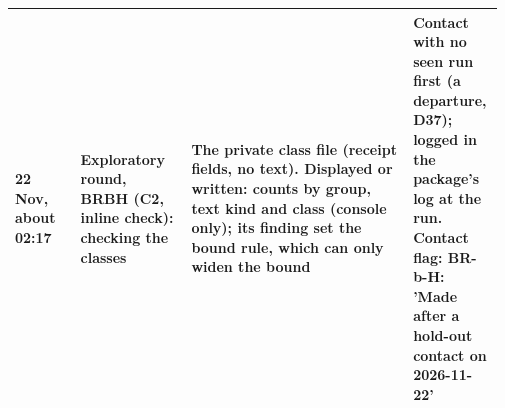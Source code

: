 {\begin{tabular}{@{}p{0.13\linewidth}p{0.22\linewidth}p{0.44\linewidth}p{0.18\linewidth}@{}}
22 Nov, about 02:17 & Exploratory round, BRBH (C2, inline check): checking the classes & The private class file (receipt fields, no text). Displayed or written: counts by group, text kind and class (console only); its finding set the bound rule, which can only widen the bound & Contact with no seen run first (a departure, D37); logged in the package's log at the run. Contact flag: BR-b-H: 'Made after a hold-out contact on 2026-11-22' \\
\bottomrule
\end{tabular}}
